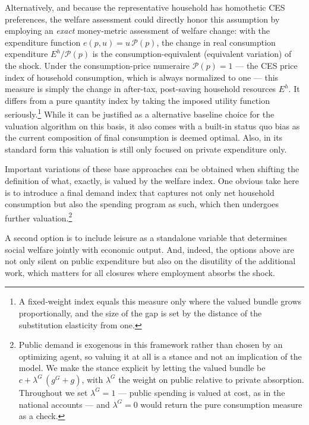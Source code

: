 Alternatively, and because the representative household has homothetic CES preferences, the welfare assessment could directly honor this assumption by employing an \emph{exact} money-metric assessment of welfare change: with the expenditure function $e(p,u)=u\,\mathcal{P}(p)$, the change in real consumption expenditure $E^h/\mathcal{P}(p)$ is the consumption-equivalent (equivalent variation) of the shock. Under the consumption-price numeraire $\mathcal{P}(p)=1$ --- the CES price index of household consumption, which is always normalized to one --- this measure is simply the change in after-tax, post-saving household resources $E^h$.  It differs from a pure quantity index by taking the imposed utility function seriously.\footnote{A fixed-weight index equals this measure only where the valued bundle grows proportionally, and the size of the gap is set by the distance of the substitution elasticity from one.} 
While it can be justified as a alternative baseline choice for the valuation algorithm on this basis, it also comes with a built-in status quo bias as the current composition of final consumption is deemed optimal. Also, in its standard form this valuation is still only focused on private expenditure only.

Important variations of these base approaches can be obtained when shifting the definition of what, exactly, is valued by the welfare index. One obvious take here is to introduce a final demand index that captures not only net household consumption but also the spending program as such, which then undergoes further valuation.\footnote{Public demand is exogenous in this framework rather than chosen by an optimizing agent, so valuing it at all is a stance and not an implication of the model. We make the stance explicit by letting the valued bundle be $c+\lambda^{G}\,(g^G+g)$, with $\lambda^{G}$ the weight on public relative to private absorption. Throughout we set $\lambda^{G}=1$ --- public spending is valued at cost, as in the national accounts --- and $\lambda^{G}=0$ would return the pure consumption measure as a check.} 

A second option is to include leisure as a standalone variable that determines social welfare jointly with economic output. And, indeed, the options above are not only silent on public expenditure but also on the disutility of the additional work, which matters for all closures where employment absorbs the shock.

